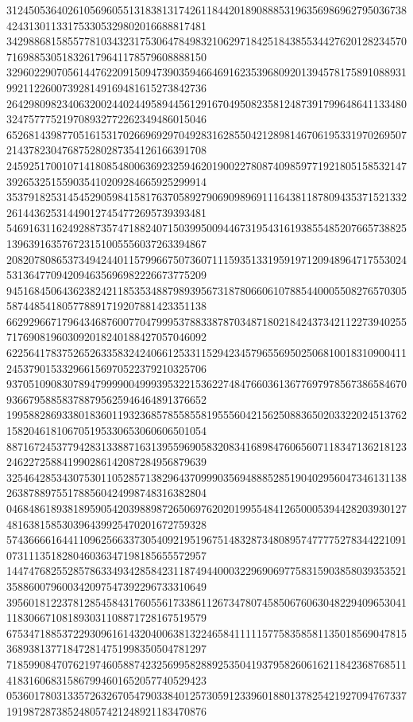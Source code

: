 \begin{DoxyCode}
      312450536402610569605513183813174261184420189088853196356986962795036738424313011331753305329802016688817481
      342988681585577810343231753064784983210629718425184385534427620128234570716988530518326179641178579608888150
      329602290705614476220915094739035946646916235396809201394578175891088931992112260073928149169481615273842736
      264298098234063200244024495894456129167049508235812487391799648641133480324757775219708932772262349486015046
      652681439877051615317026696929704928316285504212898146706195331970269507214378230476875280287354126166391708
      245925170010714180854800636923259462019002278087409859771921805158532147392653251559035410209284665925299914
      353791825314545290598415817637058927906909896911164381187809435371521332261443625314490127454772695739393481
      546916311624928873574718824071503995009446731954316193855485207665738825139639163576723151005556037263394867
      208207808653734942440115799667507360711159351331959197120948964717553024531364770942094635696982226673775209
      945168450643623824211853534887989395673187806606107885440005508276570305587448541805778891719207881423351138
      662929667179643468760077047999537883387870348718021842437342112273940255717690819603092018240188427057046092
      622564178375265263358324240661253311529423457965569502506810018310900411245379015332966156970522379210325706
      937051090830789479999004999395322153622748476603613677697978567386584670936679588583788795625946464891376652
      199588286933801836011932368578558558195556042156250883650203322024513762158204618106705195330653060606501054
      887167245377942831338871631395596905832083416898476065607118347136218123246227258841990286142087284956879639
      325464285343075301105285713829643709990356948885285190402956047346131138263878897551788560424998748316382804
      046848618938189590542039889872650697620201995548412650005394428203930127481638158530396439925470201672759328
      574366661644110962566337305409219519675148328734808957477775278344221091073111351828046036347198185655572957
      144747682552857863349342858423118749440003229690697758315903858039353521358860079600342097547392296733310649
      395601812237812854584317605561733861126734780745850676063048229409653041118306671081893031108871728167519579
      675347188537229309616143204006381322465841111157758358581135018569047815368938137718472814751998350504781297
      718599084707621974605887423256995828892535041937958260616211842368768511418316068315867994601652057740529423
      053601780313357263267054790338401257305912339601880137825421927094767337191987287385248057421248921183470876

\end{DoxyCode}
